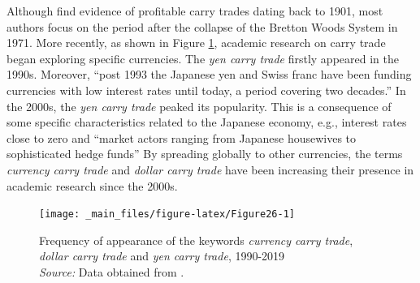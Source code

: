 \documentclass[a4paper, twoside]{templates/ociamthesis}
\begin{document}
Although \textcite{doskov2015} find evidence of profitable carry trades dating back to 1901, most authors focus on the period after the collapse of the Bretton Woods System in 1971. More recently, as shown in Figure \ref{fig:Figure26}, academic research on carry trade began exploring specific currencies. The \emph{yen carry trade} firstly appeared in the 1990s. Moreover, ``post 1993 the Japanese yen and Swiss franc have been funding currencies with low interest rates until today, a period covering two decades.'' \autocite[ 373]{doskov2015} In the 2000s, the \emph{yen carry trade} peaked its popularity. This is a consequence of some specific characteristics related to the Japanese economy, e.g., interest rates close to zero and ``market actors ranging from Japanese housewives to sophisticated hedge funds'' \autocite[ 373]{krugman2018} By spreading globally to other currencies, the terms \emph{currency carry trade} and \emph{dollar carry trade} have been increasing their presence in academic research since the 2000s.



\begin{figure}[!ht]

{\centering \texttt{[image: \_main\_files/figure-latex/Figure26-1]} 

}

\caption[Frequency of appearance of the keywords \textit{currency carry trade}, \textit{dollar carry trade} and \textit{yen carry trade}, 1990-2019]{Frequency of appearance of the keywords \textit{currency carry trade}, \textit{dollar carry trade} and \textit{yen carry trade}, 1990-2019 \\ \scriptsize \textit{Source:} Data obtained from \textcite{googlebooksngramviewer2021a}.}\label{fig:Figure26}
\end{figure}
\end{document}
